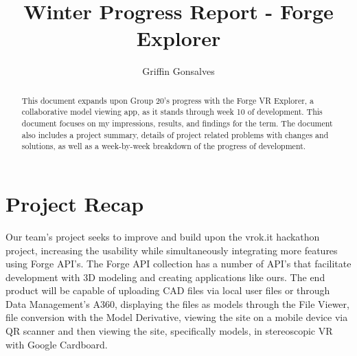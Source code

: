 \documentclass[letterpaper, 10pt, draftclsnofoot, compsoc, onecolumn]{IEEEtran}
\begin{document}
\title{Winter Progress Report - Forge Explorer}
\author{Griffin Gonsalves}
\maketitle
\hspace*{\fill}\hspace*{\fill}
\vspace{8cm}


\begin{abstract}
This document expands upon Group 20's progress with the Forge VR Explorer, a collaborative model viewing app, as it stands through week 10 of development. This document focuses on my impressions, results, and findings for the term. The document also includes a project summary, details of project related problems with changes and solutions, as well as a week-by-week breakdown of the progress of development. 
\end{abstract}
\IEEEpeerreviewmaketitle

\newpage 

\setcounter{tocdepth}{2}
\renewcommand\contentsname{}
\tableofcontents

\bigskip
\clearpage
{}

\section{Project Recap}

Our team's project seeks to improve and build upon the vrok.it hackathon project, increasing the usability while simultaneously integrating more features using Forge API's. The Forge API collection has a number of API's that facilitate development with 3D modeling and creating applications like ours. The end product will be capable of uploading CAD files via local user files or through Data Management’s A360, displaying the files as models through the File Viewer, file conversion with the Model Derivative, viewing the site on a mobile device via QR scanner and then viewing the site, specifically models, in stereoscopic VR with Google Cardboard.
\end{document}
